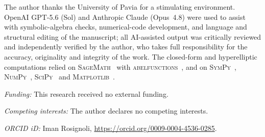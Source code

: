\documentclass[12pt]{iopart}
\theoremstyle{plain}
\theoremstyle{definition}
\theoremstyle{remark}
\begin{document}
\ack
The author thanks the University of Pavia for a stimulating environment. OpenAI
GPT-5.6 (Sol) and Anthropic Claude (Opus~4.8) were used to assist with symbolic-algebra
checks, numerical-code development, and language and structural editing of the manuscript;
all AI-assisted output was critically reviewed and independently verified by the author,
who takes full responsibility for the accuracy, originality and integrity of the work. The
closed-form and hyperelliptic computations relied on \textsc{SageMath}~\cite{SageMath}
with \textsc{abelfunctions}~\cite{abelfunctions}, and on
\textsc{SymPy}~\cite{SymPy}, \textsc{NumPy}~\cite{NumPy}, \textsc{SciPy}~\cite{SciPy} and
\textsc{Matplotlib}~\cite{Matplotlib}.

\medskip\noindent\textit{Funding:} This research received no external funding.

\medskip\noindent\textit{Competing interests:} The author declares no competing interests.

\medskip\noindent\textit{ORCID iD:} Iman Rosignoli,
\url{https://orcid.org/0009-0004-4536-0285}.

\nocite{*}


\end{document}
